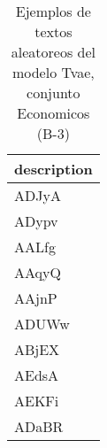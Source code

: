 \begin{table}[H]
\centering
\fontsize{8}{14}\selectfont
\caption{Ejemplos de textos aleatoreos del modelo Tvae, conjunto Economicos (B-3)}
\label{table-sample10-economicos-b-3-tvae-text}
\begin{tabular}{|m{50em}|}
\hline
\rowcolor[gray]{0.8}
description \\
\hline ADJyA \\
\hline ADypv \\
\hline AALfg \\
\hline AAqyQ \\
\hline AAjnP \\
\hline ADUWw \\
\hline ABjEX \\
\hline AEdsA \\
\hline AEKFi \\
\hline ADaBR \\
\hline
\end{tabular}
\end{table}
